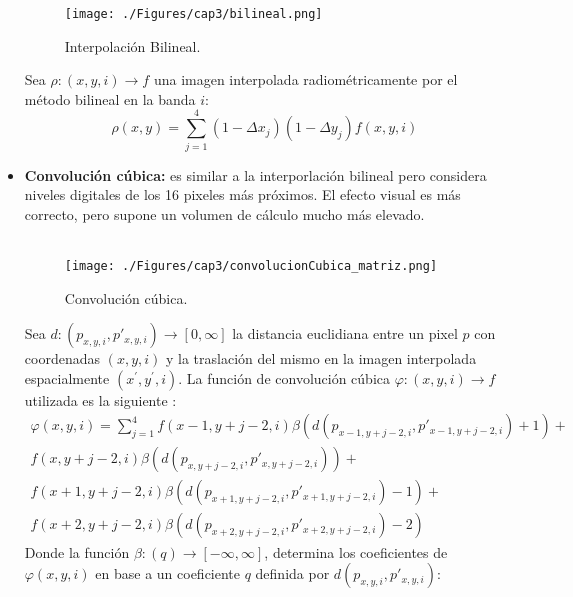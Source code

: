 \begin{itemize}
		\begin{figure}[H]
			\centering
			\texttt{[image: ./Figures/cap3/bilineal.png]}
			\caption{Interpolaci\'on Bilineal.}
			\label{fig:bilineal2}
		\end{figure}
		Sea $ \rho:(x,y,i) \longrightarrow f$ una imagen interpolada radiom\'etricamente por el m\'etodo bilineal en la banda $ i $:
		\begin{equation}
		\rho(x,y) = \sum_{j=1}^{4}(1-\Delta x_{j})(1-\Delta y_{j})f(x,y,i)
		\end{equation}	
		    		\item \textbf{Convoluci\'on c\'ubica:} es similar a la interporlaci\'on bilineal pero considera niveles digitales de los 16 pixeles m\'as pr\'oximos. El efecto visual es m\'as correcto, pero supone un volumen de c\'alculo mucho m\'as elevado. \\~\\
		    				    \begin{figure}[H]
		    				    	\centering
		    				    	\texttt{[image: ./Figures/cap3/convolucionCubica\_matriz.png]}
		    				    	\caption{Convoluci\'on c\'ubica.}
		    				    	\label{fig:convCubica2}
		    				    \end{figure}
					Sea $ d:(p_{x,y,i},p'_{x,y,i})\longrightarrow [0,\infty] $ la distancia euclidiana entre un pixel $ p $ con coordenadas $ (x,y,i) $ y la traslaci\'on del mismo en la imagen interpolada espacialmente $ (x^{'},y^{'},i)$. La funci\'on de convoluci\'on c\'ubica $ \varphi:(x,y,i) \longrightarrow f$ utilizada es la siguiente \cite{guide1999erdas}:
										\begin{align}
										\varphi(x,y,i) = \sum_{j=1}^{4} f(x-1,y+j-2,i)\beta(d(p_{x-1,y+j-2,i},p'_{x-1,y+j-2,i})+1)+ \nonumber \\
										f(x,y+j-2,i)\beta(d(p_{x,y+j-2,i},p'_{x,y+j-2,i}))+ \nonumber \\
										f(x+1,y+j-2,i)\beta(d(p_{x+1,y+j-2,i},p'_{x+1,y+j-2,i})-1)+ \nonumber \\
										f(x+2,y+j-2,i)\beta(d(p_{x+2,y+j-2,i},p'_{x+2,y+j-2,i})-2)
										\end{align}
					Donde la funci\'on $ \beta:(q) \longrightarrow [-\infty,\infty] $, determina los coeficientes de $ \varphi(x,y,i) $ en base a un coeficiente $ q $ definida por $ d(p_{x,y,i},p'_{x,y,i}) $:

\end{itemize}
